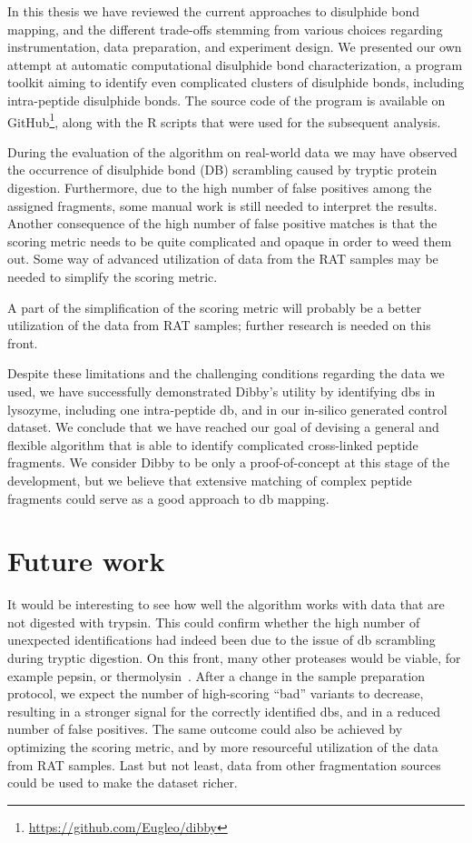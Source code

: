 
In this thesis we have reviewed the current approaches to disulphide bond mapping, and the different trade-offs stemming from various choices regarding instrumentation, data preparation, and experiment design. We presented our own attempt at automatic computational disulphide bond characterization, a program toolkit aiming to identify even complicated clusters of disulphide bonds, including intra-peptide disulphide bonds. The source code of the program is available on GitHub\footnote{\url{https://github.com/Eugleo/dibby}}, along with the R scripts that were used for the subsequent analysis.

During the evaluation of the algorithm on real-world data we may have observed the occurrence of disulphide bond (DB) scrambling caused by tryptic protein digestion. Furthermore, due to the high number of false positives among the assigned fragments, some manual work is still needed to interpret the results. Another consequence of the high number of false positive matches is that the scoring metric needs to be quite complicated and opaque in order to weed them out. Some way of advanced utilization of data from the RAT samples may be needed to simplify the scoring metric.

A part of the simplification of the scoring metric will probably be a better utilization of the data from RAT samples; further research is needed on this front.

Despite these limitations and the challenging conditions regarding the data we used, we have successfully demonstrated Dibby's utility by identifying \glspl*{db} in lysozyme, including one intra-peptide \gls*{db}, and in our in-silico generated control dataset. We conclude that we have reached our goal of devising a general and flexible algorithm that is able to identify complicated cross-linked peptide fragments. We consider Dibby to be only a proof-of-concept at this stage of the development, but we believe that extensive matching of complex peptide fragments could serve as a good approach to \gls*{db} mapping.

\section*{Future work}

It would be interesting to see how well the algorithm works with data that are not digested with trypsin. This could confirm whether the high number of unexpected identifications had indeed been due to the issue of \gls*{db} scrambling during tryptic digestion. On this front, many other proteases would be viable, for example pepsin, or thermolysin~\cite{sung2016evaluation}. After a change in the sample preparation protocol, we expect the number of high-scoring ``bad'' variants to decrease, resulting in a stronger signal for the correctly identified \glspl*{db}, and in a reduced number of false positives. The same outcome could also be achieved by optimizing the scoring metric, and by more resourceful utilization of the data from RAT samples. Last but not least, data from other fragmentation sources could be used to make the dataset richer.

